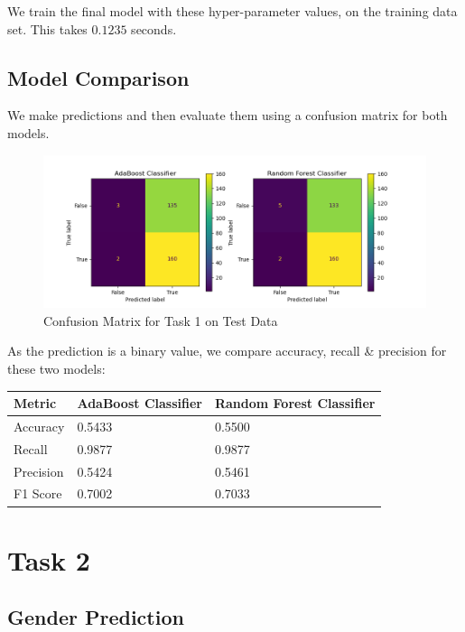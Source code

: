 \documentclass{article}
\begin{document}
    We train the final model with these hyper-parameter values, on the training data set. This takes $0.1235$ seconds.

\subsection{Model Comparison}
    We make predictions and then evaluate them using a confusion matrix for both models.
    \begin{figure}[h]
        \centering
        \includegraphics[width=\linewidth]{Task 1.png}
        \caption{Confusion Matrix for Task 1 on Test Data}
        \end{figure}

    As the prediction is a binary value, we compare accuracy, recall \& precision for these two models:
    \begin{table}[h]
        \begin{center}
            \begin{tabular}{|l|l|l|}
                \hline
                Metric &AdaBoost Classifier &Random Forest Classifier \\
                \hline
                Accuracy &0.5433 &0.5500 \\
                Recall &0.9877 &0.9877 \\
                Precision &0.5424 &0.5461 \\
                F1 Score &0.7002 &0.7033 \\
                \hline
            \end{tabular}
        \end{center}
    \end{table}

\newpage

\section{Task 2}

\subsection{Gender Prediction}
\end{document}
